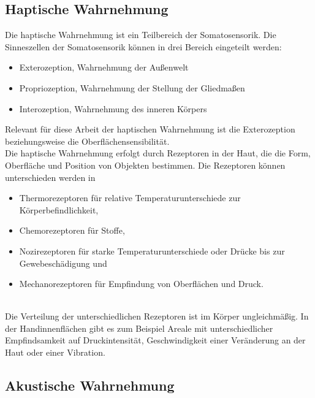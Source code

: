 \subsection{Haptische Wahrnehmung}
Die haptische Wahrnehmung ist ein Teilbereich der Somatosensorik. Die Sinneszellen der Somatosensorik können in drei Bereich eingeteilt werden:
\begin{itemize}
	\item Exterozeption, Wahrnehmung der Außenwelt
	\item Propriozeption, Wahrnehmung der Stellung der Gliedmaßen
	\item Interozeption, Wahrnehmung des inneren Körpers
\end{itemize}
Relevant für diese Arbeit der haptischen Wahrnehmung ist die Exterozeption beziehungsweise die Oberflächensensibilität. \cite[Vgl. Seite 26]{Sprenger.2020}\\
Die haptische Wahrnehmung erfolgt durch Rezeptoren in der Haut, die die Form, Oberfläche und Position von Objekten bestimmen. Die Rezeptoren können unterschieden werden in
\begin{itemize}
	\item Thermorezeptoren für relative Temperaturunterschiede zur Körperbefindlichkeit, 
	\item Chemorezeptoren für Stoffe,
	\item Nozirezeptoren für starke Temperaturunterschiede oder Drücke bis zur Gewebeschädigung und
	\item Mechanorezeptoren für Empfindung von Oberflächen und Druck.
\end{itemize}
\cite[Vgl. Seite 26f]{Sprenger.2020}\\
Die Verteilung der unterschiedlichen Rezeptoren ist im Körper ungleichmäßig. In der Handinnenflächen gibt es zum Beispiel Areale mit unterschiedlicher Empfindsamkeit \glqq auf Druckintensität, Geschwindigkeit einer Veränderung an der Haut oder einer Vibration. \grqq \cite[Seite 29]{Sprenger.2020}
\subsection{Akustische Wahrnehmung}
